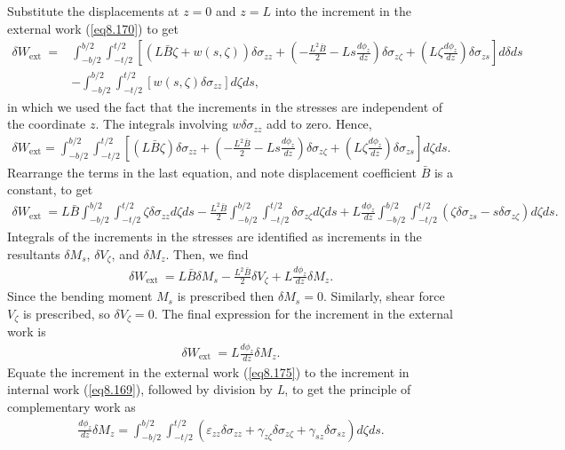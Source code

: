 \documentclass{AeroStructure-ERJohnson}
\begin{document}
Substitute the displacements at $z=0$ and $z=L$ into the increment
in the external work (\ref{eq8.170}) to get
\begin{align*}
\delta W_{\text {ext }}=&
\int_{-b/ 2}^{b/ 2}\int_{-t/2}^{t/ 2}
\left[(L \bar{B} \zeta+w(s, \zeta)) \delta \sigma_{z
z}+\left(-\frac{L^{2} \bar{B}}{2}-L s \frac{d \phi_{z}}{d
z}\right) \delta \sigma_{z \zeta}+\left(L \zeta \frac{d
\phi_{z}}{d z}\right) \delta \sigma_{z s}\right] d \delta d
s\nonumber\\
&-\int_{-b/ 2}^{b/ 2}\int_{-t/2}^{t/ 2}\left[w(s, \zeta) \delta
\sigma_{z z}\right] d \zeta d s,
\end{align*}
in which we used the fact that the increments in the stresses are
independent of the coordinate $z$. The integrals involving $w
\delta \sigma_{z z}$ add to zero. Hence,
\begin{align*}
\delta W_{\mathrm{ext}}=\int_{-b/ 2}^{b/ 2}\int_{-t/2}^{t/ 2}
\left[(L \bar{B} \zeta) \delta \sigma_{z
z}+\left(-\frac{L^{2} \bar{B}}{2}-L s \frac{d \phi_{z}}{d
z}\right) \delta \sigma_{z \zeta}+\left(L \zeta \frac{d
\phi_{z}}{d z}\right) \delta \sigma_{z s}\right] d \zeta d s.
\end{align*}
Rearrange the terms in the last equation, and note displacement
coefficient $\bar{B}$ is a constant, to get
\begin{align}\label{eq8.173}
\delta W_{\text {ext }}=L \bar{B} \int_{-b/ 2}^{b/ 2}\int_{-t/2}^{t/ 2} \zeta \delta \sigma_{zz} d \zeta d s-\frac{L^{2}
\bar{B}}{2} \int_{-b/ 2}^{b/ 2}\int_{-t/2}^{t/ 2} \delta\sigma_{z\zeta} d \zeta d s+L \frac{d \phi_{z}}{d z} \int_{-b/ 2}^{b/ 2}\int_{-t/2}^{t/ 2}\left(\zeta \delta \sigma_{z s}-s \delta
\sigma_{z \zeta}\right) d \zeta d s.
\end{align}
Integrals of the increments in the stresses are identified as
increments in the resultants $\delta M_{s}$, $\delta V_{\zeta}$,
and $\delta M_{z}$. Then, we find
\begin{align}\label{eq8.174}
\delta W_{\text {ext }}=L \bar{B} \delta M_{s}-\frac{L^{2}
\bar{B}}{2} \delta V_{\zeta}+L \frac{d \phi_{z}}{d z} \delta
M_{z}.
\end{align}
Since the bending moment $M_{s}$ is prescribed then $\delta
M_{s}=0$. Similarly, shear force $V_{\zeta}$ is prescribed, so
$\delta V_{\zeta}=0$. The final expression for the increment in
the external work is
\begin{align}\label{eq8.175}
\delta W_{\text {ext }}=L \frac{d \phi_{z}}{d z} \delta M_{z}.
\end{align}
Equate the increment in the external work (\ref{eq8.175}) to the
increment in internal work (\ref{eq8.169}), followed by division
by \textit{L}, to get the principle of complementary work as
\begin{align}\label{eq8.176}
\frac{d \phi_{z}}{d z} \delta M_{z}=\int_{-b/ 2}^{b/ 2}\int_{-t/2}^{t/ 2}
\left(\varepsilon_{z z} \delta \sigma_{z z}+\gamma_{z
\zeta} \delta \sigma_{z \zeta}+\gamma_{s z} \delta \sigma_{s
z}\right) d \zeta d s.
\end{align}
\end{document}
